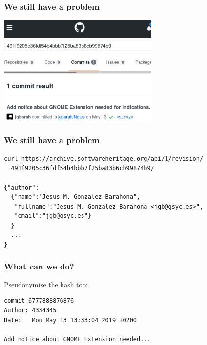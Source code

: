 \documentclass[17pt,aspectratio=169,hyperref={pdfusetitle,colorlinks,allcolors=olive}]{beamer}
\begin{document}
\begin{frame}[fragile]
  \frametitle{We still have a problem}

  \begin{center}
  \includegraphics[width=8cm]{figs/github-hash}
  \end{center}  
  
\end{frame}

\begin{frame}[fragile]
  \frametitle{We still have a problem}

{\small
\begin{verbatim}
curl https://archive.softwareheritage.org/api/1/revision/
  491f9205c36fdf54b4bbb7f25ba83b6cb99874b9/

{"author":
  {"name":"Jesus M. Gonzalez-Barahona",
   "fullname":"Jesus M. Gonzalez-Barahona <jgb@gsyc.es>",
   "email":"jgb@gsyc.es"}
  }
  ...
}
\end{verbatim}  
}

\end{frame}

\begin{frame}[fragile]
  \frametitle{What can we do?}

  Pseudonymize the hash too:

{\small
\begin{verbatim}
commit 6777888876876
Author: 4334345
Date:   Mon May 13 13:33:04 2019 +0200

Add notice about GNOME Extension needed...
\end{verbatim}  
}
  
\end{frame}
\end{document}
